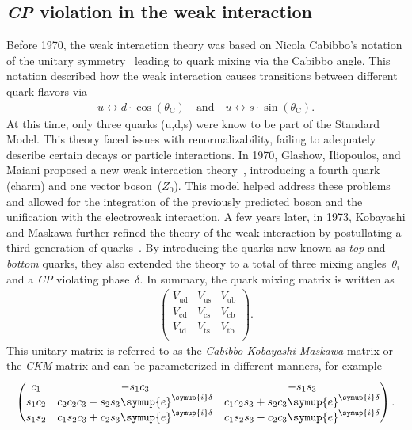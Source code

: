 \subsection{\textit{CP} violation in the weak interaction}
\label{sec:cpv}
Before 1970, the weak interaction theory was based on Nicola Cabibbo's notation of the unitary symmetry~\cite{Cabibbo_paper} leading to quark mixing via 
the Cabibbo angle. This notation described how the weak interaction causes transitions between different quark flavors via  
\begin{align*}
    u \leftrightarrow d\cdot\cos(\theta_{\mathrm{C}}) \quad \text{and} \quad u \leftrightarrow s\cdot\sin(\theta_{\mathrm{C}}).
\end{align*}
At this time, only three quarks (u,d,s) were know to be part of the Standard Model.
This theory faced issues with renormalizability, failing to adequately describe certain decays or particle interactions. 
In 1970, Glashow, Iliopoulos, and Maiani proposed a new weak interaction theory~\cite{GIM_paper}, introducing a fourth quark (charm) and one vector boson~($Z_0$). 
This model helped address these problems and allowed for the integration of the previously predicted boson and the unification with the electroweak interaction.
A few years later, in 1973, Kobayashi and Maskawa further refined the theory of the weak interaction by postullating a third generation of quarks~\cite{KM_paper}.
By introducing the quarks now known as \textit{top} and \textit{bottom} quarks, they also extended the theory to a total of three mixing angles~$\theta_i$ and a \textit{CP}
violating phase~$\delta$. In summary, the quark mixing matrix is written as
\begin{align*}
    \begin{pmatrix}
        V_{\mathrm{ud}} & V_{\mathrm{us}} & V_{\mathrm{ub}} \\
        V_{\mathrm{cd}} & V_{\mathrm{cs}} & V_{\mathrm{cb}} \\
        V_{\mathrm{td}} & V_{\mathrm{ts}} & V_{\mathrm{tb}} \\
    \end{pmatrix}.
\end{align*}
This unitary matrix is referred to as the \textit{Cabibbo-Kobayashi-Maskawa} matrix or the \textit{CKM} matrix and can be parameterized in different manners, 
for example 
\begin{align*}
    \begin{pmatrix}
        c_1 & -s_1c_3 & -s_1s_3 \\
        s_1c_2 & c_2c_2c_3 -s _2s_3\symup{e}^{\symup{i}\delta} & c_1c_2s_3 + s_2c_3\symup{e}^{\symup{i}\delta} \\
        s_1s_2 & c_1s_2c_3 + c_2s_3\symup{e}^{\symup{i}\delta} & c_1s_2s_3 - c_2c_3\symup{e}^{\symup{i}\delta} \\
    \end{pmatrix}.
\end{align*}
